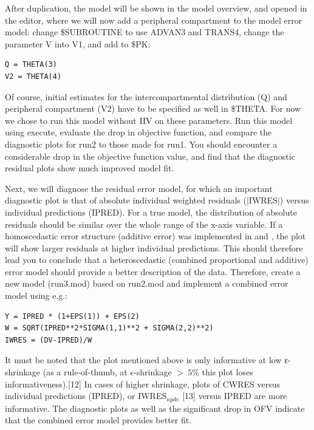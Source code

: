 After duplication, the model  will be shown in the model
overview, and opened in the editor, where we will now add a peripheral
compartment to the model error model: change \$SUBROUTINE to use ADVAN3
and TRANS4, change the parameter V into V1, and add to \$PK: 

\begin{lstlisting}
Q = THETA(3)
V2 = THETA(4)
\end{lstlisting}

\noindent Of course, initial estimates for the intercompartmental distribution
(Q) and peripheral compartment (V2) have to be specified as well in
\$THETA. For now we chose to run this model without IIV on these
parameters. Run this model using execute, evaluate the drop in
objective function, and compare the diagnostic plots for run2 to those
made for run1. You should encounter a considerable drop in the
objective function value, and find that the diagnostic residual plots
show much improved model fit. 

Next, we will diagnose the residual error model, for which an
important diagnostic plot is that of absolute individual weighted
residuals ($|$IWRES$|$) versus individual predictions (IPRED). For a true
model, the distribution of absolute residuals should be similar over
the whole range of the x-axis variable. If a homoscedastic error
structure (additive error) was implemented in  and ,
the plot will show larger residuals at higher individual 
predictions. This should therefore lead you to conclude that a
heteroscedastic (combined proportional and additive) error model
should provide a better description of the data. Therefore, create a
new model (run3.mod) based on run2.mod and implement a combined error
model using e.g.: 

\begin{lstlisting}
Y = IPRED * (1+EPS(1)) + EPS(2)
W = SQRT(IPRED**2*SIGMA(1,1)**2 + SIGMA(2,2)**2)
IWRES = (DV-IPRED)/W
\end{lstlisting}

\noindent It must be noted that the plot mentioned above is only
informative at low ε-shrinkage (as a rule-of-thumb, at $\epsilon$-shrinkage $>
~5\%$ this plot loses informativeness).[12] In cases of higher
shrinkage, plots of CWRES versus individual predictions (IPRED), or
IWRES$_{npde}$ [13] versus IPRED are more informative. The diagnostic plots
as well as the significant drop in OFV indicate that the combined
error model provides better fit. 

